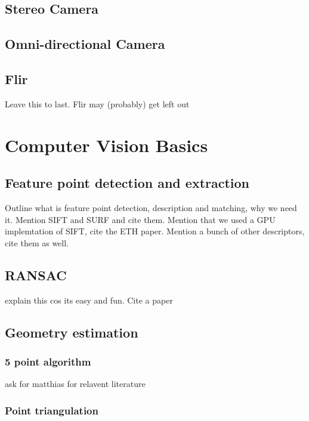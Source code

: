 \subsection{Stereo Camera}

\subsection{Omni-directional Camera}

\subsection{Flir}
Leave this to last.  Flir may (probably) get left out

\section{Computer Vision Basics}

\subsection{Feature point detection and extraction}

Outline what is feature point detection, description and matching, why we need
it.  Mention SIFT
and SURF and cite them.  Mention that we used a GPU implemtation of SIFT, cite
the ETH paper. 
Mention a bunch of other descriptors, cite them as well.

\subsection{RANSAC}

explain this cos its easy and fun.  Cite a paper

\subsection{Geometry estimation}

\subsubsection{5 point algorithm}

ask for matthias for relavent literature

\subsubsection{Point triangulation}

